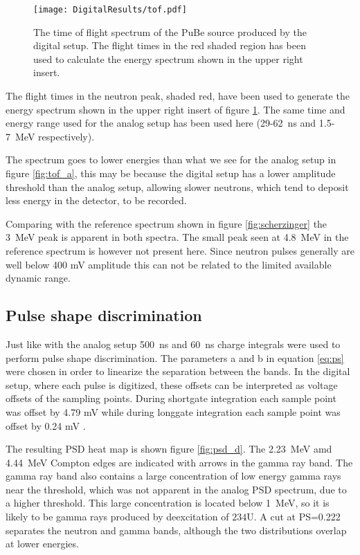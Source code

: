 \documentclass[main.tex]{subfiles}
\begin{document}
\begin{figure}[ht]
    \centering
        \texttt{[image: DigitalResults/tof.pdf]}
        \caption[Time of flight spectrum, digital setup.]{The time of flight spectrum of the PuBe source produced by the digital setup. The flight times in the red shaded region has been used to calculate the energy spectrum shown in the upper right insert.}
    \label{fig:tof_d} 
\end{figure}

The flight times in the neutron peak, shaded red, have been used to generate the energy spectrum shown in the upper right insert of figure \ref{fig:tof_d}. The same time and energy range used for the analog setup has been used here (29-\SI{62}{\ns} and 1.5-\SI{7}{\MeV} respectively). 

The spectrum goes to lower energies than what we see for the analog setup in figure \ref{fig:tof_a}, this may be because the digital setup has a lower amplitude threshold than the analog setup, allowing slower neutrons, which tend to deposit less energy in the detector, to be recorded.

Comparing with the reference spectrum shown in figure \ref{fig:scherzinger} the  \SI{3}{MeV} peak is apparent in both spectra. The small peak seen at \SI{4.8}{MeV} in the reference spectrum is however not present here. Since neutron pulses generally are well below 400 mV amplitude this can not be related to the limited available dynamic range.

\subsection{Pulse shape discrimination}
Just like with the analog setup \SI{500}{ns} and \SI{60}{ns} charge integrals were used to perform pulse shape discrimination. The parameters a and b in equation \ref{eq:ps} were chosen in order to linearize the separation between the bands. In the digital setup, where each pulse is digitized, these offsets can be interpreted as voltage offsets of the sampling points. During shortgate integration each sample point was offset by 4.79 mV while during longgate integration each sample point was offset by 0.24 mV .

The resulting PSD heat map is shown figure \ref{fig:psd_d}. The \SI{2.23}{\MeV} amd \SI{4.44}{MeV} Compton edges are indicated with arrows in the gamma ray band. The gamma ray band also contains a large concentration of low energy gamma rays near the threshold, which was not apparent in the analog PSD spectrum, due to a higher threshold. This large concentration is located below \SI{1}{MeV}, so it is likely to be gamma rays produced by deexcitation of $\text{234}$U.
A cut at PS=0.222 separates the neutron and gamma bands, although the two distributions overlap at lower energies.
\end{document}
